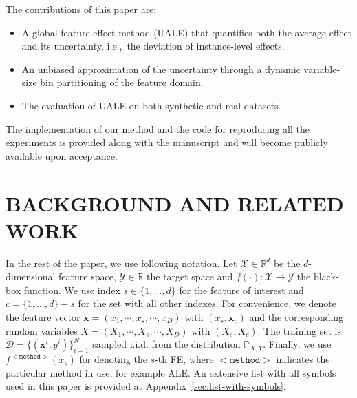 \documentclass[twoside]{article}
\newcommand{\xc}{\mathbf{x}_c}
\newcommand{\xb}{\mathbf{x}}
\begin{document}
The contributions of this
paper are:
\begin{itemize}
\item A global feature effect method (UALE) that quantifies both the
  average effect and its uncertainty, i.e.,~the deviation of
  instance-level effects.
\item An unbiased approximation of the uncertainty through a dynamic
  variable-size bin partitioning of the feature domain.
\item The evaluation of UALE on both synthetic and real datasets.
\end{itemize}

The implementation of our method and the code for reproducing all the
experiments is provided along with the manuscript and will become
publicly available upon acceptance.

\section{BACKGROUND AND RELATED WORK}

In the rest of the paper, we use following notation. Let \(\mathcal{X} \in \mathbb{R}^d\) be the \(d\)-dimensional feature
space, \(\mathcal{Y} \in \mathbb{R}\) the target space and
\(f(\cdot) : \mathcal{X} \rightarrow \mathcal{Y}\) the black-box
function. We use index \(s \in \{1, \ldots, d\}\) for the feature of
interest and \(c = \{1, \ldots, d\} - s\) for the set with all other
indexes. For convenience, we denote the feature vector
\(\xb = (x_1, \cdots , x_s, \cdots, x_D)\) with \((x_s, \xc)\) and the
corresponding random variables
\(X = (X_1, \cdots , X_s, \cdots, X_D)\) with \((X_s, X_c)\). The
training set is \(\mathcal{D} = \{(\xb^i, y^i)\}_{i=1}^N\) sampled
i.i.d. from the distribution \(\mathbb{P}_{X,Y}\). Finally, we use
\(f^{\mathtt{<method>}}(x_s)\) for denoting the \(s\)-th FE, where
\(\mathtt{<method>}\) indicates the particular method in use, for
example ALE. An extensive list with all symbols used in this paper is
provided at Appendix~\ref{sec:list-with-symbols}.
\end{document}
